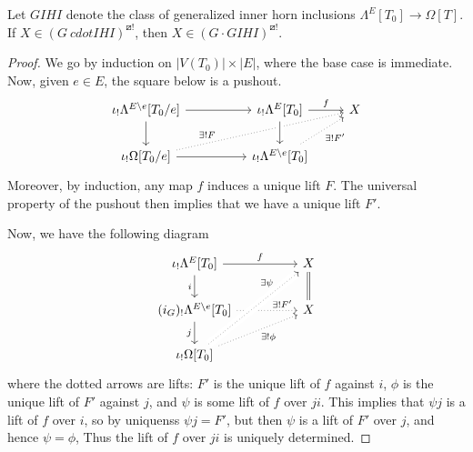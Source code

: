 \documentclass[a4paper,10pt,draft]{article}%
\begin{document}
\begin{lemma}
      Let $GIHI$ denote the class of generalized inner horn inclusions $\Lambda^E[T_0] \to \Omega[T]$. 
      If $X \in (G\ cdot IHI)^{\boxslash !}$, then
      $X \in (G \cdot GIHI)^{\boxslash !}$. 
\end{lemma}
\begin{proof}
      We go by induction on $|V(T_0)| \times |E|$, where the base case is immediate.
      Now, given $e\in E$, the square below is a pushout.
      \begin{equation}
            \begin{tikzcd}
                  \iota_!\Lambda^{E\setminus e}[T_0/e] \arrow[rr] \arrow[d]
                  &&
                  \iota_!\Lambda^E[T_0] \arrow[r, "f"]
                  &
                  X
                  \\
                  \iota_!\Omega[T_0/e] \arrow[rr] \arrow[urrr, dotted, near start, "\exists! F"]
                  &&
                  \iota_!\Lambda^{E\setminus e}[T_0] \arrow[ur, dotted, "\exists! F'"'] \arrow[u, leftarrow, crossing over]
            \end{tikzcd}
      \end{equation}
      Moreover, by induction, any map $f$ induces a unique lift $F$.
      The universal property of the pushout then implies that we have a unique lift $F'$.

      Now, we have the following diagram
      \begin{equation}
            \begin{tikzcd}
                  \iota_!\Lambda^{E}[T_0] \arrow[rr, "f"] \arrow[d, "i"']
                  &&
                  X \arrow[d, equal]
                  \\
                  |[alias = U]| (i_G)_!\Lambda^{E \setminus e}[T_0] \arrow[d, "j"'] \arrow[rr, dotted, near end, "\exists! F'"]
                  &&
                  |[alias=V]| X
                  \\
                  \iota_!\Omega[T_0]
                  \arrow[uurr, dotted, near end, crossing over, "\exists \psi"] \arrow[urr, dotted, "\exists! \phi"']
            \end{tikzcd}
      \end{equation}
      where the dotted arrows are lifts:
      $F'$ is the unique lift of $f$ against $i$,
      $\phi$ is the unique lift of $F'$ against $j$, and
      $\psi$ is some lift of $f$ over $ji$.
      This implies that $\psi j$ is a lift of $f$ over $i$, so by uniquenss $\psi j = F'$, but then
      $\psi$ is a lift of $F'$ over $j$, and hence $\psi = \phi$,
      Thus the lift of $f$ over $j i$ is uniquely determined.
\end{proof}
\end{document}
